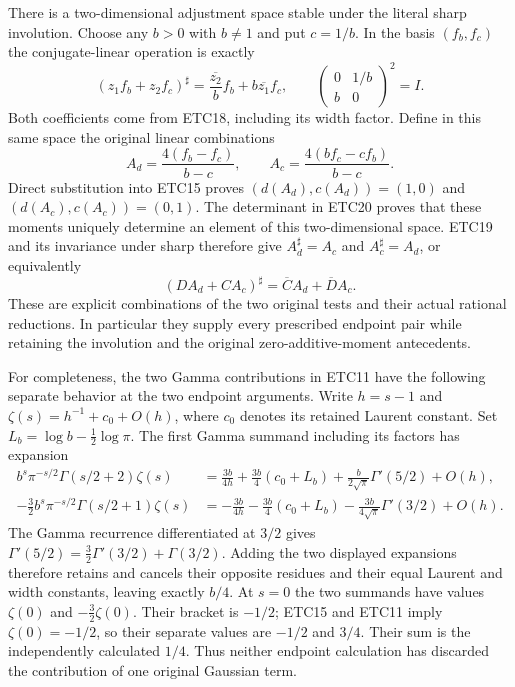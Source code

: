 \documentclass[11pt]{article}
\begin{document}
There is a two-dimensional adjustment space stable under the literal
sharp involution. Choose any $b>0$ with $b\ne1$ and put $c=1/b$.
In the basis $(f_b,f_c)$ the conjugate-linear operation is exactly
\begin{equation}\tag{ETC23}
 (z_1f_b+z_2f_c)^\sharp
 =\frac{\overline{z_2}}b f_b
       +b\overline{z_1}f_c,\qquad
 \begin{pmatrix}0&1/b\\b&0\end{pmatrix}^{\!2}=I.
\end{equation}
Both coefficients come from ETC18, including its width factor.
Define in this same space the original linear combinations
\begin{equation}\tag{ETC24}
 A_d=\frac{4(f_b-f_c)}{b-c},\qquad
 A_c=\frac{4(bf_c-cf_b)}{b-c}.
\end{equation}
Direct substitution into ETC15 proves
$(d(A_d),c(A_d))=(1,0)$ and $(d(A_c),c(A_c))=(0,1)$.
The determinant in ETC20 proves that these moments uniquely determine
an element of this two-dimensional space. ETC19 and its invariance
under sharp therefore give $A_d^\sharp=A_c$ and
$A_c^\sharp=A_d$, or equivalently
\begin{equation}\tag{ETC25}
 (D A_d+C A_c)^\sharp
       =\overline C A_d+\overline D A_c.
\end{equation}
These are explicit combinations of the two original tests and their
actual rational reductions. In particular they supply every prescribed
endpoint pair while retaining the involution and the original
zero-additive-moment antecedents.

For completeness, the two Gamma contributions in ETC11 have the
following separate behavior at the two endpoint arguments. Write
$h=s-1$ and $\zeta(s)=h^{-1}+c_0+O(h)$, where $c_0$ denotes its
retained Laurent constant. Set $L_b=\log b-\tfrac12\log\pi$.
The first Gamma summand including its factors has expansion
\begin{equation}\tag{ETC26}
 \begin{split}
 b^s\pi^{-s/2}\Gamma(s/2+2)\zeta(s)
 &=\frac{3b}{4h}+\frac{3b}{4}(c_0+L_b)
                     +\frac{b}{2\sqrt\pi}\Gamma'(5/2)+O(h),\\
 -\frac32b^s\pi^{-s/2}\Gamma(s/2+1)\zeta(s)
 &=-\frac{3b}{4h}-\frac{3b}{4}(c_0+L_b)
                     -\frac{3b}{4\sqrt\pi}\Gamma'(3/2)+O(h).
 \end{split}
\end{equation}
The Gamma recurrence differentiated at $3/2$ gives
$\Gamma'(5/2)=\tfrac32\Gamma'(3/2)+\Gamma(3/2)$.
Adding the two displayed expansions therefore retains and cancels
their opposite residues and their equal Laurent and width constants,
leaving exactly $b/4$. At $s=0$ the two summands have values
$\zeta(0)$ and $-\tfrac32\zeta(0)$. Their bracket is $-1/2$;
ETC15 and ETC11 imply $\zeta(0)=-1/2$, so their separate values
are $-1/2$ and $3/4$. Their sum is the independently calculated
$1/4$. Thus neither endpoint calculation has discarded the
contribution of one original Gaussian term.
\end{document}
